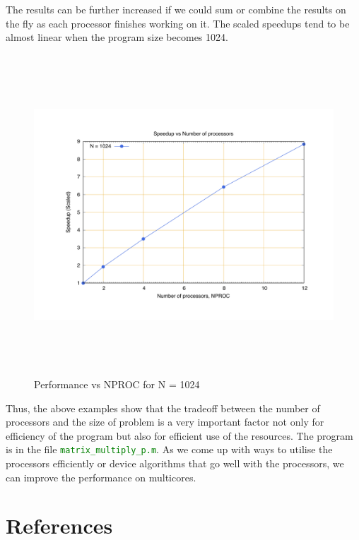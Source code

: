 \documentclass[fleqn,letterpaper,12pt]{report}
\begin{document}
The results can be further increased if we could sum or combine the results on the fly as each processor finishes working on it.
\newpage
The scaled speedups tend to be almost linear when the program size becomes 1024.
\begin{figure}[htbp]
	\centering
	\includegraphics[height=120mm,width=160mm]{1024smat.pdf}
	\caption{Performance vs NPROC for N = 1024\label{overflow}}
\end{figure}

Thus, the above examples show that the tradeoff between the number of processors and the size of problem is a very important factor not only for efficiency of the program but also for efficient use of the resources. The program is in the file {\tt\textcolor{Green}{matrix\_multiply\_p.m}}. As we come up with ways to utilise the processors efficiently or device algorithms that go well with the processors, we can improve the performance on multicores.
\vfill

\newpage
{}
\section*{References}


\end{document}
